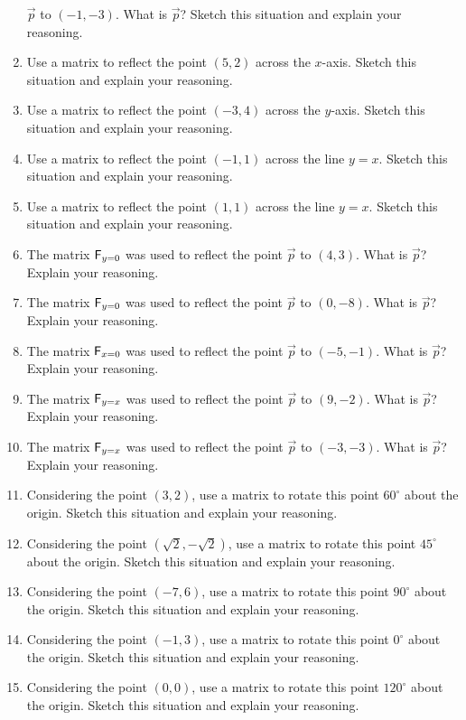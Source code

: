 \begin{problems}
\begin{enumerate}
  $\vec{p}$ to $(-1,-3)$.  What is $\vec{p}$? Sketch this situation
  and explain your reasoning.
\item Use a matrix to reflect the point $(5,2)$ across the
  $x$-axis. Sketch this situation and explain your reasoning.
\item Use a matrix to reflect the point $(-3,4)$ across the
  $y$-axis. Sketch this situation and explain your reasoning.
\item Use a matrix to reflect the point $(-1,1)$ across the line
  $y=x$. Sketch this situation
  and explain your reasoning.
\item Use a matrix to reflect the point $(1,1)$ across the line
  $y=x$. Sketch this situation
  and explain your reasoning.
\item The matrix $\mathsf{F}_{y=0}$ was used to reflect the point $\vec{p}$
  to $(4,3)$.  What is $\vec{p}$? Explain your reasoning.
\item The matrix $\mathsf{F}_{y=0}$ was used to reflect the point $\vec{p}$
  to $(0,-8)$.  What is $\vec{p}$? Explain your reasoning.
\item The matrix $\mathsf{F}_{x=0}$ was used to reflect the point $\vec{p}$
  to $(-5,-1)$.  What is $\vec{p}$? Explain your reasoning.
\item The matrix $\mathsf{F}_{y=x}$ was used to reflect the point $\vec{p}$
  to $(9,-2)$.  What is $\vec{p}$? Explain your reasoning.
\item The matrix $\mathsf{F}_{y=x}$ was used to reflect the point $\vec{p}$
  to $(-3,-3)$.  What is $\vec{p}$? Explain your reasoning.
\item Considering the point $(3,2)$, use a matrix to rotate this point
  $60^\circ$ about the origin.  Sketch this situation and explain your
  reasoning.  
\item Considering the point $(\sqrt{2},-\sqrt{2})$, use a matrix to
  rotate this point $45^\circ$ about the origin.  Sketch this
  situation and explain your reasoning.
\item Considering the point $(-7,6)$, use a matrix to rotate this point
  $90^\circ$ about the origin.  Sketch this situation and explain your
  reasoning.  
\item Considering the point $(-1,3)$, use a matrix to rotate this point
  $0^\circ$ about the origin.  Sketch this situation and explain your
  reasoning.  
\item Considering the point $(0,0)$, use a matrix to rotate this point
  $120^\circ$ about the origin.  Sketch this situation and explain your
  reasoning.  

\end{enumerate}
\end{problems}
